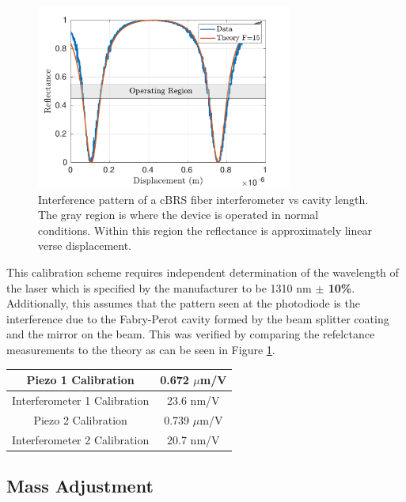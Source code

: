 \documentclass [12pt, proquest]{uwthesis}[2019]
\begin{document}
\begin{figure}[!h]
\begin{center}
 \includegraphics[width=0.75\textwidth]{cBRS_Fringes.pdf}
\caption[Interference pattern of a cBRS fiber interferometer vs cavity length]{Interference pattern of a cBRS fiber interferometer vs cavity length. The gray region is where the device is operated in normal conditions. Within this region the reflectance is approximately linear verse displacement.}
\label{cBRS_fringes}
\end{center}
\end{figure}

This calibration scheme requires independent determination of the wavelength of the laser which is specified by the manufacturer to be 1310 nm \textbf{$\pm$ 10\%}. Additionally, this assumes that the pattern seen at the photodiode is the interference due to the Fabry-Perot cavity formed by the beam splitter coating and the mirror on the beam. This was verified by comparing the refelctance measurements to the theory as can be seen in Figure \ref{cBRS_fringes}.

\begin{center}
\begin{tabular}{| c | c |}
\hline
Piezo 1 Calibration & 0.672 $\mu$m/V\\
\hline
Interferometer 1 Calibration & 23.6 nm/V\\
\hline
Piezo 2 Calibration & 0.739 $\mu$m/V\\
\hline
Interferometer 2 Calibration& 20.7 nm/V\\
\hline
\end{tabular}
\label{calTable}
\end{center}

\subsection{Mass Adjustment}
\end{document}
